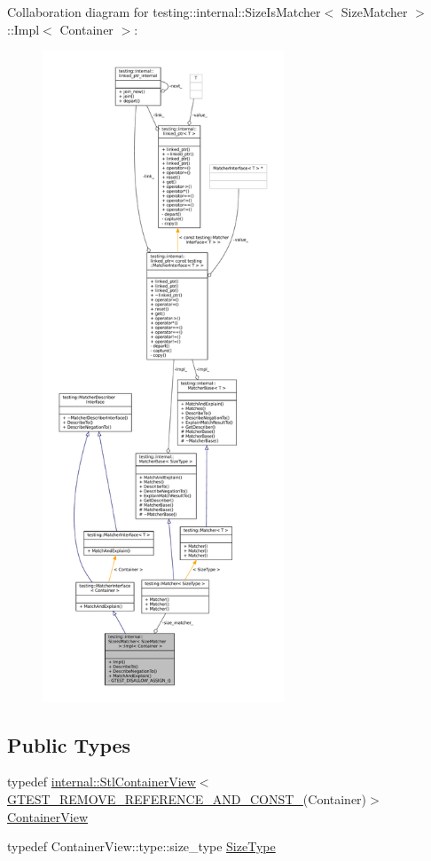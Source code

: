 Collaboration diagram for testing\+:\+:internal\+:\+:Size\+Is\+Matcher$<$ Size\+Matcher $>$\+:\+:Impl$<$ Container $>$\+:
\nopagebreak
\begin{figure}[H]
\begin{center}
\leavevmode
\includegraphics[height=550pt]{classtesting_1_1internal_1_1SizeIsMatcher_1_1Impl__coll__graph}
\end{center}
\end{figure}
\subsection*{Public Types}
\begin{DoxyCompactItemize}
\item 
typedef \hyperlink{classtesting_1_1internal_1_1StlContainerView}{internal\+::\+Stl\+Container\+View}$<$ \hyperlink{gtest-internal_8h_a874567b176266188fabfffb8393267ce}{G\+T\+E\+S\+T\+\_\+\+R\+E\+M\+O\+V\+E\+\_\+\+R\+E\+F\+E\+R\+E\+N\+C\+E\+\_\+\+A\+N\+D\+\_\+\+C\+O\+N\+S\+T\+\_\+}(Container)$>$ \hyperlink{classtesting_1_1internal_1_1SizeIsMatcher_1_1Impl_ae848755998eaaaa5e38366a2fc8b55e2}{Container\+View}
\item 
typedef Container\+View\+::type\+::size\+\_\+type \hyperlink{classtesting_1_1internal_1_1SizeIsMatcher_1_1Impl_a5548da0c4c2245ca2fb520f44f0a687a}{Size\+Type}
\end{DoxyCompactItemize}

